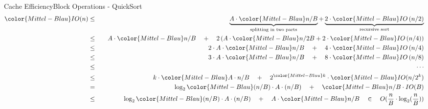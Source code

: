 
\begin{frame}{Cache Efficiency}{Block Operations - QuickSort}
{\color{Mittel-Blau}
  \begin{eqnarray*}
    {\color{Mittel-Blau}IO(n)} &\leq\hspace{1em}&
      \underbrace{
        A \cdot {\color{Mittel-Blau}n / B}
      }_{\text{splitting in two parts}}
      +
      \underbrace{
        2 \cdot {\color{Mittel-Blau}IO\left(n / 2 \right)}
      }_{\text{recursive sort}}\\
    {} &\leq&
      A \cdot {\color{Mittel-Blau} n / B} \hspace{1em}+ \hspace{1em}2 \left(
        A \cdot {\color{Mittel-Blau} n /2 B}
        + 2 \cdot {\color{Mittel-Blau}IO\left( n / 4 \right)}
      \right)\\
    {} &\leq&
      2 \cdot A \cdot {\color{Mittel-Blau} n / B}
      \hspace{1em}+ \hspace{1em}4 \cdot {\color{Mittel-Blau}IO\left( n / 4 \right)}\\
    {} &\leq&
      3 \cdot A \cdot {\color{Mittel-Blau} n / B}
      \hspace{1em}+ \hspace{1em}8 \cdot {\color{Mittel-Blau}IO\left( n / 8 \right)}\\  
    {} &\leq&\hspace{1.5em}\cdots\\
    {} &\leq&
      k \cdot {\color{Mittel-Blau}A \cdot n /B }
      \hspace{1em}+\hspace{1em} 2^{\color{Mittel-Blau}k}
      \cdot {\color{Mittel-Blau}IO(n / 2^k)}\\
    {} &=&
      \log_2 {\color{Mittel-Blau} (n / B) \cdot A \cdot (n / B)}
      \hspace{1em}+\hspace{1em} {\color{Mittel-Blau} n /B \cdot IO(B)}\\
    {} &\leq&
      \log_2 {\color{Mittel-Blau} (n /B) \cdot A \cdot (n / B)}
      \hspace{1em}+\hspace{1em} A \cdot {\color{Mittel-Blau} n/ B }
      \hspace{1em} \in \hspace{1em} O(\frac{n}{B}  \cdot \log_2 (\frac{n}{B}) )
  \end{eqnarray*}}
\end{frame}

